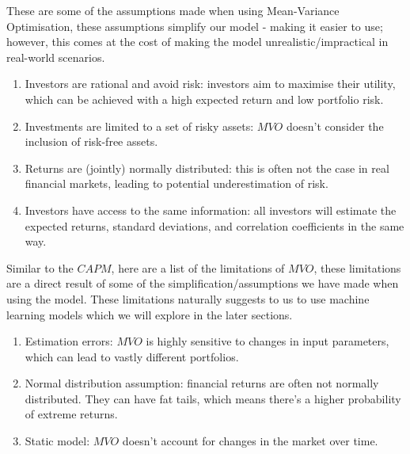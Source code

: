 \documentclass[a4paper,12pt,titlepage]{article}
\numberwithin{equation}{section}
\begin{document}
These are some of the assumptions made when using Mean-Variance Optimisation, these
assumptions simplify our model - making it easier to use; however, this comes at the cost of
making the model unrealistic/impractical in real-world scenarios.

\begin{enumerate}
	
	\item Investors are rational and avoid risk: investors aim to maximise their utility, which can 
		be achieved with a high expected return and low portfolio risk.
	
	\item Investments are limited to a set of risky assets: $MVO$ doesn't consider the inclusion of 
		risk-free assets.
	
	\item Returns are (jointly) normally distributed: this is often not the case in real financial 
		markets, leading to potential underestimation of risk.
	
	\item Investors have access to the same information: all investors will estimate the expected 
		returns, standard deviations, and correlation coefficients in the same way.

\end{enumerate}

Similar to the $CAPM$, here are a list of the limitations of $MVO$, these limitations are a direct
result of some of the simplification/assumptions we have made when using the model. These
limitations naturally suggests to us to use machine learning models which we will explore in the
later sections.

\begin{enumerate}

	\item Estimation errors: $MVO$ is highly sensitive to changes in input parameters, which can lead 
		to vastly different portfolios.
	
	\item Normal distribution assumption: financial returns are often not normally distributed. 
		They can have fat tails, which means there's a higher probability of extreme returns.
	
	\item Static model: $MVO$ doesn't account for changes in the market over time.
	
\end{enumerate}
	
\end{document}
